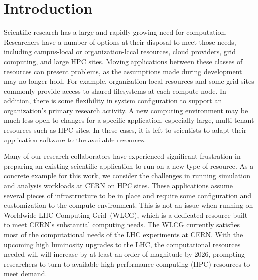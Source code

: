 \documentclass[sigconf]{acmart}
\begin{document}
\maketitle

\section{Introduction}

Scientific research has a large and rapidly growing need for computation.
Researchers have a number of options at their disposal to meet those needs,
including campus-local or organization-local resources,
cloud providers,
grid computing,
and large HPC sites.
Moving applications between these classes of resources can present problems,
as the assumptions made during development may no longer hold.
For example, organization-local resources and some grid sites commonly provide access to shared filesystems at each compute node.
In addition, there is some flexibility in system configuration to support an organization's primary research activity.
A new computing environment may be much less open to changes for a specific application,
especially large, multi-tenant resources such as HPC sites.
In these cases, it is left to scientists to adapt their application software to the available resources.

Many of our research collaborators have experienced significant frustration in preparing an existing scientific application to run on a new type of resource.
As a concrete example for this work,
we consider the challenges in running simulation and analysis workloads at CERN on HPC sites.
These applications assume several pieces of infrastructure to be in place and require some configuration and customization to the compute environment.
This is not an issue when running on Worldwide LHC Computing Grid~(WLCG),
which is a dedicated resource built to meet CERN's substantial computing needs.
The WLCG currently satisfies most of the computational needs of the LHC experiments at CERN.
With the upcoming high luminosity upgrades to the LHC,
the computational resources needed will will increase by at least an order of magnitude by 2026,
prompting researchers to turn to available high performance computing (HPC) resources to meet demand.
\end{document}
